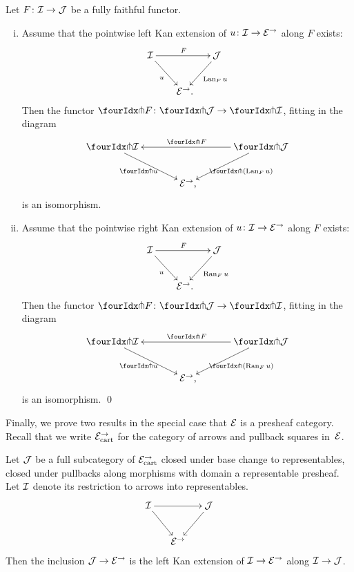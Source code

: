 \documentclass[reqno,10pt,a4paper,oneside,draft]{amsart}
\begin{document}
{{\begin{proposition} \label{kan-extension-closure}
Let $F \co \cal{I} \to \cal{J}$ be a fully faithful functor.
\begin{enumerate}[(i)]
\item Assume that the pointwise left Kan extension of $u \co \cal{I} \to \catE^\to$ along $F$ exists:
\[
\xymatrix@!C@C-1em{
  \cal{I}
  \ar[dr]_{u}
  \ar[rr]^{F}
&&
  \cal{J}
  \ar[dl]^{\Lan_F u}
\\&
  \catE^\to
\rlap{.}}
\]
Then the functor $\liftr{F} \co \liftr{\cal{J}} \to \liftr{\cal{I}}$, fitting in the diagram
\[
\xymatrix@!C@C-1em{
  \liftr{\cal{I}}
  \ar[dr]_{\liftr{u}}
&&
  \liftr{\cal{J}}
  \ar[ll]_{\liftr{F}}
  \ar[dl]^{\liftr{(\Lan_F u)}}
\\&
  \catE^\to
\rlap{,}}
\]
is an isomorphism.
\item Assume that the pointwise right Kan extension of $u \co \cal{I} \to \catE^\to$ along $F$ exists:
\[
\xymatrix@!C@C-1em{
  \cal{I}
  \ar[dr]_{u}
  \ar[rr]^{F}
&&
  \cal{J}
  \ar[dl]^{\Ran_F u}
\\&
  \catE^\to
\rlap{.}}
\]
Then the functor $\liftl{F} \co \liftl{\cal{J}} \to \liftl{\cal{I}}$, fitting in the diagram
\[
\xymatrix@!C@C-1em{
  \liftl{\cal{I}}
  \ar[dr]_{\liftl{u}}
&&
  \liftl{\cal{J}}
  \ar[ll]_{\liftl{F}}
  \ar[dl]^{\liftl{(\Ran_F u)}}
\\&
  \catE^\to
\rlap{,}}
\]
is an isomorphism.
\qed
\end{enumerate}
\end{proposition}



Finally, we prove two results in the special case that $\catE$ is a presheaf category. Recall that
we write $\catE_{\cart}^\to$ for the category of arrows and pullback squares in~$\cal{E}$.

\begin{lemma} \label{left-kan-extension-of-representables}
Let $\cal{J}$ be a full subcategory of $\catE_{\cart}^\to$ closed under base change to representables, \ie closed under pullbacks along morphisms with domain a representable presheaf.
Let $\cal{I}$ denote its restriction to arrows into representables.
\[
\xymatrix@C-1em{
  \cal{I}
  \ar[rr]
  \ar[dr]
&&
  \cal{J}
  \ar[dl]
\\&
  \catE^\to
}
\]
Then the inclusion $\cal{J} \to \catE^\to$ is the left Kan extension of $\cal{I} \to \catE^\to$ along $\cal{I} \to \cal{J}$.
\end{lemma}

}}
\end{document}
